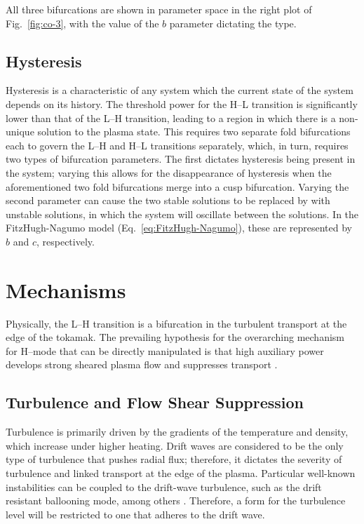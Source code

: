 All three bifurcations are shown in parameter space in the right plot of Fig.~\ref{fig:co-3}, with the value of the $b$ parameter dictating the type.

\subsection{Hysteresis}\label{ssec:hysteresis}
Hysteresis is a characteristic of any system which the current state of the system depends on its history.
The threshold power for the H--L transition is significantly lower than that of the L--H transition, leading to a region in which there is a non-unique solution to the plasma state.
This requires two separate fold bifurcations each to govern the L--H and H--L transitions separately, which, in turn, requires two types of bifurcation parameters.
The first dictates hysteresis being present in the system; varying this allows for the disappearance of hysteresis when the aforementioned two fold bifurcations merge into a cusp bifurcation.
Varying the second parameter can cause the two stable solutions to be replaced by with unstable solutions, in which the system will oscillate between the solutions.
In the FitzHugh-Nagumo model (Eq.~\ref{eq:FitzHugh-Nagumo}), these are represented by $b$ and $c$, respectively.
\todo{\color{red}{What to do here?}}

\section{Mechanisms}\label{sec:mechanics}
Physically, the L--H transition is a bifurcation in the turbulent transport at the edge of the tokamak.
The prevailing hypothesis for the overarching mechanism for H--mode that can be directly manipulated is that high auxiliary power develops strong sheared plasma flow and suppresses transport \cite{freidberg_plasma_2007}.

\subsection{Turbulence and Flow Shear Suppression}\label{ssec:turbulence_sheared}
Turbulence is primarily driven by the gradients of the temperature and density, which increase under higher heating.
Drift waves are considered to be the only type of turbulence that pushes radial flux; therefore, it dictates the severity of turbulence and linked transport at the edge of the plasma.
Particular well-known instabilities can be coupled to the drift-wave turbulence, such as the drift resistant ballooning mode, among others \cite{scott_three-dimensional_1997}.
Therefore, a form for the turbulence level will be restricted to one that adheres to the drift wave.

